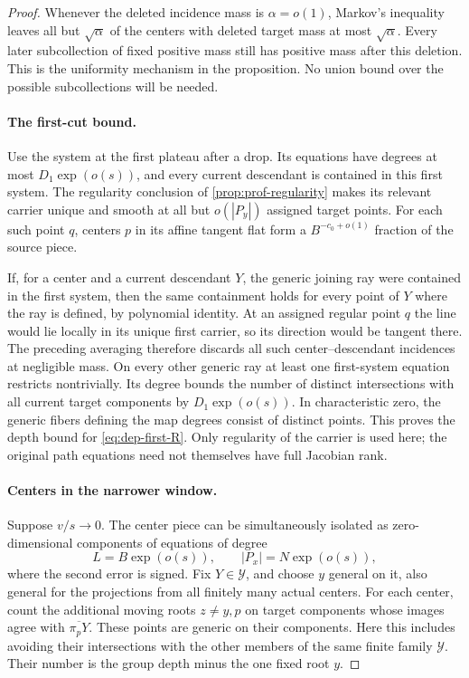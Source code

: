 \begin{proof}
Whenever the deleted incidence mass is $\alpha=o(1)$, Markov's inequality leaves all but $\sqrt\alpha$ of the centers with deleted target mass at most $\sqrt\alpha$. Every later subcollection of fixed positive mass still has positive mass after this deletion. This is the uniformity mechanism in the proposition. No union bound over the possible subcollections will be needed.

\paragraph{The first-cut bound.}
Use the system at the first plateau after a drop. Its equations have degrees at most $D_1\exp(o(s))$, and every current descendant is contained in this first system. The regularity conclusion of \cref{prop:prof-regularity} makes its relevant carrier unique and smooth at all but $o(|P_y|)$ assigned target points. For each such point $q$, centers $p$ in its affine tangent flat form a $B^{-c_0+o(1)}$ fraction of the source piece.

If, for a center and a current descendant $Y$, the generic joining ray were contained in the first system, then the same containment holds for every point of $Y$ where the ray is defined, by polynomial identity. At an assigned regular point $q$ the line would lie locally in its unique first carrier, so its direction would be tangent there. The preceding averaging therefore discards all such center--descendant incidences at negligible mass. On every other generic ray at least one first-system equation restricts nontrivially. Its degree bounds the number of distinct intersections with all current target components by $D_1\exp(o(s))$. In characteristic zero, the generic fibers defining the map degrees consist of distinct points. This proves the depth bound for \eqref{eq:dep-first-R}. Only regularity of the carrier is used here; the original path equations need not themselves have full Jacobian rank.

\paragraph{Centers in the narrower window.}
Suppose $v/s\to0$. The center piece can be simultaneously isolated as zero-dimensional components of equations of degree
\[
 L=B\exp(o(s)),\qquad |P_x|=N\exp(o(s)),
\]
where the second error is signed. Fix $Y\in\mathcal{Y}$, and choose $y$ general on it, also general for the projections from all finitely many actual centers. For each center, count the additional moving roots $z\ne y,p$ on target components whose images agree with $\overline{\pi_pY}$. These points are generic on their components. Here this includes avoiding their intersections with the other members of the same finite family $\mathcal{Y}$. Their number is the group depth minus the one fixed root $y$.


\end{proof}
